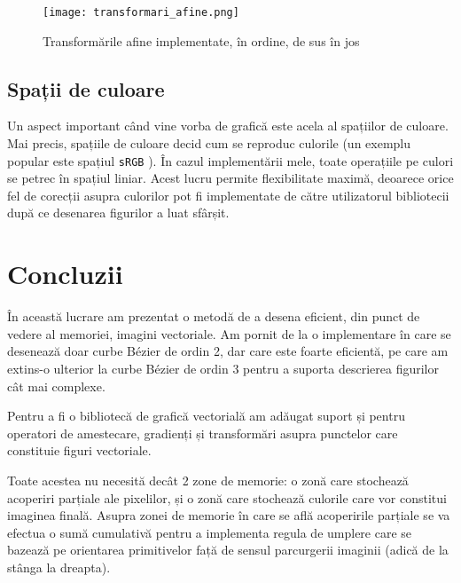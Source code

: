 \documentclass[a4paper, 12pt]{report}
\begin{document}
\begin{figure}[ht]
    \texttt{[image: transformari\_afine.png]}
    \centering
    \caption{Transformările afine implementate, în ordine, de sus în jos}
    \label{fig-transforms}
\end{figure}

\section{Spații de culoare}

Un aspect important când vine vorba de grafică este acela al spațiilor de culoare. Mai precis, spațiile de culoare decid cum
se reproduc culorile (un exemplu popular este spațiul \texttt{sRGB} \cite{sRGB}). În cazul implementării mele, toate operațiile
pe culori se petrec în spațiul liniar. Acest lucru permite flexibilitate maximă, deoarece orice fel de corecții asupra
culorilor pot fi implementate de către utilizatorul bibliotecii după ce desenarea figurilor a luat sfârșit.

\chapter{Concluzii}

În această lucrare am prezentat o metodă de a desena eficient, din punct de vedere al memoriei, imagini vectoriale. Am pornit
de la o implementare în care se desenează doar curbe Bézier de ordin 2, dar care este foarte eficientă, pe care am extins-o
ulterior la curbe Bézier de ordin 3 pentru a suporta descrierea figurilor cât mai complexe.

Pentru a fi o bibliotecă de grafică vectorială am adăugat suport și pentru operatori de amestecare, gradienți și transformări
asupra punctelor care constituie figuri vectoriale.

Toate acestea nu necesită decât 2 zone de memorie: o zonă care stochează acoperiri parțiale ale pixelilor, și o zonă care
stochează culorile care vor constitui imaginea finală. Asupra zonei de memorie în care se află acoperirile parțiale se va
efectua o sumă cumulativă pentru a implementa regula de umplere care se bazează pe orientarea primitivelor față de sensul
parcurgerii imaginii (adică de la stânga la dreapta).

\printbibliography
\end{document}
